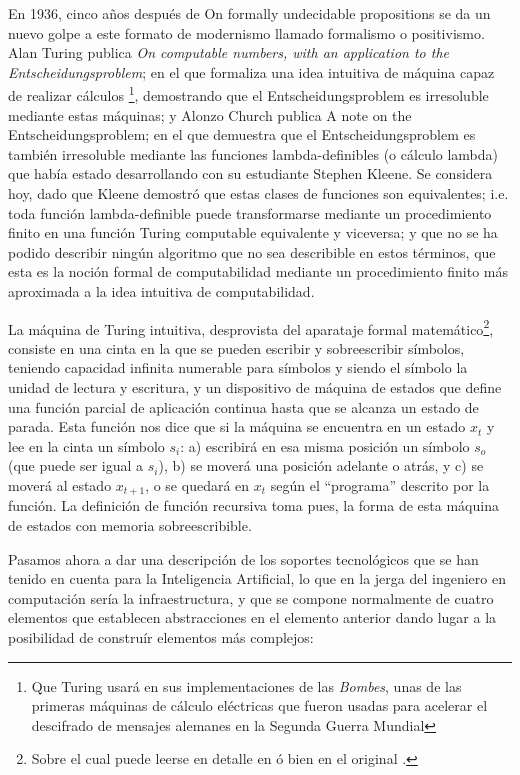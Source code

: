 \documentclass[12pt]{memoir}
\begin{document}
En 1936, cinco años después de On formally undecidable propositions se da un nuevo golpe a este formato de modernismo llamado formalismo o positivismo. Alan Turing publica \textit{On computable numbers, with an application to the Entscheidungsproblem}; en el que formaliza una idea intuitiva de máquina capaz de realizar cálculos \footnote{Que Turing usará en sus implementaciones de las \textit{Bombes}, unas de las primeras máquinas de cálculo eléctricas que fueron usadas para acelerar el descifrado de mensajes alemanes en la Segunda Guerra Mundial}, demostrando que el Entscheidungsproblem es irresoluble mediante estas máquinas; y Alonzo Church publica A note on the Entscheidungsproblem; en el que demuestra que el Entscheidungsproblem es también irresoluble mediante las funciones lambda-definibles (o cálculo lambda) que había estado desarrollando con su estudiante Stephen Kleene. Se considera hoy, dado que Kleene demostró que estas clases de funciones son equivalentes; i.e. toda función lambda-definible puede transformarse mediante un procedimiento finito en una función Turing computable equivalente y viceversa; y que no se ha podido describir ningún algoritmo que no sea describible en estos términos, que esta es la noción formal de computabilidad mediante un procedimiento finito más aproximada a la idea intuitiva de computabilidad.

La máquina de Turing intuitiva, desprovista del aparataje formal matemático\footnote{Sobre el cual puede leerse en detalle en \cite{automata} ó bien en el original \cite{turingComputableNumbers}.}, consiste en una cinta en la que se pueden escribir y sobreescribir símbolos, teniendo capacidad infinita numerable para símbolos y siendo el símbolo la unidad de lectura y escritura, y un dispositivo de máquina de estados que define una función parcial de aplicación continua hasta que se alcanza un estado de parada. Esta función nos dice que si la máquina se encuentra en un estado $x_{t}$ y lee en la cinta un símbolo $s_i$: a) escribirá en esa misma posición un símbolo $s_o$ (que puede ser igual a $s_i$), b) se moverá una posición adelante o atrás, y c) se moverá al estado $x_{t+1}$, o se quedará en $x_{t}$ según el ``programa'' descrito por la función. La definición de función recursiva toma pues, la forma de esta máquina de estados con memoria sobreescribible. 

Pasamos ahora a dar una descripción de los soportes tecnológicos que se han tenido en cuenta para la Inteligencia Artificial, lo que en la jerga del ingeniero en computación sería la infraestructura, y que se compone normalmente de cuatro elementos que establecen abstracciones en el elemento anterior dando lugar a la posibilidad de construír elementos más complejos:
\end{document}
